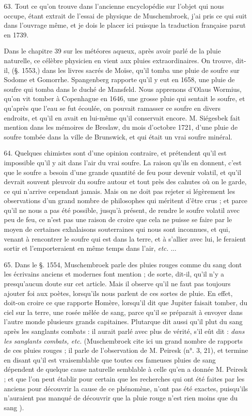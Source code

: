 \documentclass[a4paper, 11pt, oneside, polutonikogreek, french]{article}
\begin{document}
63. Tout ce qu'on trouve dans l'ancienne encyclopédie sur l'objet qui nous occupe, étant extrait de l'essai de physique de Muschembroek, j'ai pris ce qui suit dans l'ouvrage même, et je dois le placer ici puisque la traduction française parut en 1739.

Dans le chapitre 39 sur les météores aqueux, après avoir parlé de la pluie naturelle, ce célèbre physicien en vient aux pluies extraordinaires. \og On trouve, dit-il, (§. 1553,) dans les livres sacrés de Moïse, qu'il tomba une pluie de soufre sur Sodome et Gomorrhe. Spangenberg rapporte qu'il y eut en 1658, une pluie de soufre qui tomba dans le duché de Mansfeld. Nous apprenons d'Olaus Wormius, qu'on vit tomber à Copenhague en 1646, une grosse pluie qui sentait le soufre, et qu'après que l'eau se fut écoulée, on pouvait ramasser ce soufre en divers endroits, et qu'il en avait en lui-même qu'il conservait encore. M. Siégesbek fait mention dans les mémoires de Breslaw, du mois d'octobre 1721, d'une pluie de soufre tombée dans la ville de Brunswick, et qui était un vrai soufre minéral. \fg

64. \og Quelques chimistes sont d'une opinion contraire, et prétendent qu'il est impossible qu'il y ait dans l'air du vrai soufre. La raison qu'ils en donnent, c'est que le soufre a besoin d'une grande quantité de feu pour devenir volatil, et qu'il devrait souvent pleuvoir du soufre autour et tout près des cahutes où on le garde, ce qui n'arrive cependant jamais. Mais on ne doit pas rejeter si légèrement les observations d'un grand nombre de philosophes qui méritent d'être crus ; et parce qu'il ne nous a pas été possible, jusqu'à présent, de rendre le soufre volatil avec peu de feu, ce n'est pas une raison de croire que cela ne puisse se faire par le moyen de certaines exhalaisons souterraines qui nous sont inconnues, et qui, venant à rencontrer le soufre qui est dans la terre, et à s'allier avec lui, le feraient sortir et l'emporteraient en même temps dans l'air, \emph{etc.} ...

65. Dans le §. 1554, Muschembroek parle des pluies rouges comme du sang dont les écrivains anciens et modernes font mention ; de sorte, dit-il, qu'il n'y a presqu'aucun doute sur cet article. Mais il observe qu'il ne faut pas toujours ajouter foi aux poètes, lorsqu'ils nous parlent de ces sortes de pluie. \og En effet, doit-on croire ce que rapporte Homère, lorsqu'il dit que Jupiter faisait tomber, du ciel sur la terre, une rosée mêlée de sang, parce qu'il se préparait à envoyer dans l'autre monde plusieurs grands capitaines. Plutarque dit aussi qu'il plut du sang après les sanglants combats : il aurait parlé avec plus de vérité, s'il eût dit : \emph{dans les sanglants combats, etc.} \fg (Muschembroek cite ici un grand nombre de rapports de ces pluies rouges ; il parle de l'observation de M. Peiresk (n°. 3, 21), et termine en disant \og qu'il est vraisemblable que toutes ces fameuses pluies de sang dépendent de quelque cause naturelle semblable à celle qu'en a donnée M. Peiresk ; et que l'on peut établir pour certain que les recherches qui ont été faites par les anciens pour découvrir la cause de ce phénomène, n'ont pas été exactes, puisqu'ils n'auraient pas manqué de découvrir que la pluie rouge n'est rien moins que du sang \fg).
\end{document}
